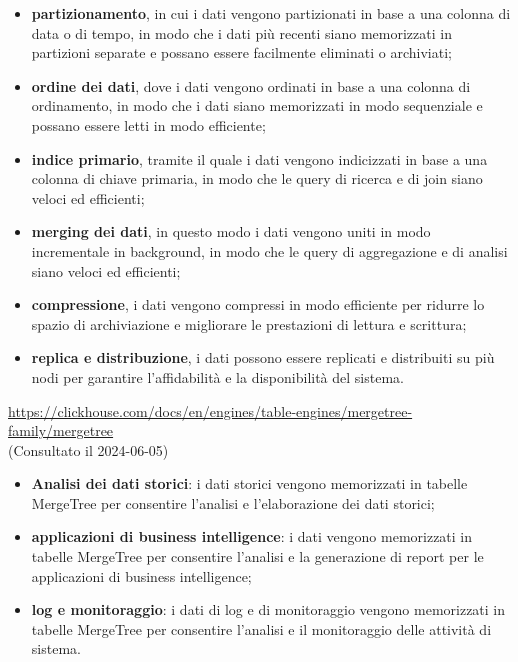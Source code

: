 \begin{itemize}
    \item \textbf{partizionamento}, in cui i dati vengono partizionati in base a una colonna di data o di tempo, in modo che i dati più recenti siano memorizzati in partizioni separate e possano essere facilmente eliminati o archiviati;
    \item \textbf{ordine dei dati}, dove i dati vengono ordinati in base a una colonna di ordinamento, in modo che i dati siano memorizzati in modo sequenziale e possano essere letti in modo efficiente;
    \item \textbf{indice primario}, tramite il quale i dati vengono indicizzati in base a una colonna di chiave primaria, in modo che le query di ricerca e di join siano veloci ed efficienti;
    \item \textbf{merging dei dati}, in questo modo i dati vengono uniti in modo incrementale in background, in modo che le query di aggregazione e di analisi siano veloci ed efficienti;
    \item \textbf{compressione}, i dati vengono compressi in modo efficiente per ridurre lo spazio di archiviazione e migliorare le prestazioni di lettura e scrittura;
    \item \textbf{replica e distribuzione}, i dati possono essere replicati e distribuiti su più nodi per garantire l'affidabilità e la disponibilità del sistema.
\end{itemize}
\url{https://clickhouse.com/docs/en/engines/table-engines/mergetree-family/mergetree} \\(Consultato il 2024-06-05)

\begin{itemize}
    \item \textbf{Analisi dei dati storici}: i dati storici vengono memorizzati in tabelle MergeTree per consentire l'analisi e l'elaborazione dei dati storici;
    \item \textbf{applicazioni di business intelligence}: i dati vengono memorizzati in tabelle MergeTree per consentire l'analisi e la generazione di report per le applicazioni di business intelligence;
    \item \textbf{log e monitoraggio}: i dati di log e di monitoraggio vengono memorizzati in tabelle MergeTree per consentire l'analisi e il monitoraggio delle attività di sistema.
\end{itemize}


